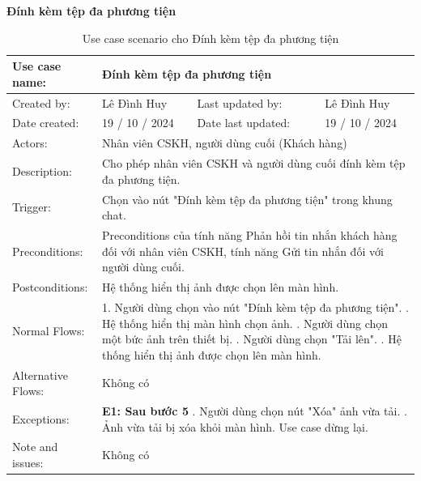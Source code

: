 \textbf{Đính kèm tệp đa phương tiện}
\begin{table}[H]
    \centering
    \begin{tabular}{|l|l|l|l|} 
        \hline
        Use case name: & \multicolumn{3}{|l|}{Đính kèm tệp đa phương tiện} \\
        \hline
        Created by: & Lê Đình Huy & Last updated by: & Lê Đình Huy \\
        \hline
        Date created: & 19 / 10 / 2024 & Date last updated: & 19 / 10 / 2024 \\
        \hline
        Actors: & \multicolumn{3}{|l|}{Nhân viên CSKH, người dùng cuối (Khách hàng)} \\
        \hline
        Description: & \multicolumn{3}{|p{12cm}|}{Cho phép nhân viên CSKH và người dùng cuối đính kèm tệp đa phương tiện.} \\ 
        \hline
        Trigger: & \multicolumn{3}{|p{12cm}|}{Chọn vào nút "Đính kèm tệp đa phương tiện" trong khung chat.} \\
        \hline
        Preconditions: & \multicolumn{3}{|p{12cm}|}{Preconditions của tính năng Phản hồi tin nhắn khách hàng đối với nhân viên CSKH, tính năng Gửi tin nhắn đối với người dùng cuối.} \\
        \hline
        Postconditions: & \multicolumn{3}{|p{12cm}|}{Hệ thống hiển thị ảnh được chọn lên màn hình.} \\
        \hline
        Normal Flows: & \multicolumn{3}{|p{12cm}|}{1. Người dùng chọn vào nút "Đính kèm tệp đa phương tiện". \newline
        2. Hệ thống hiển thị màn hình chọn ảnh. \newline
        3. Người dùng chọn một bức ảnh trên thiết bị. \newline
        4. Người dùng chọn "Tải lên". \newline
        5. Hệ thống hiển thị ảnh được chọn lên màn hình.} \\
        \hline
        Alternative Flows: & \multicolumn{3}{|p{12cm}|}{Không có} \\
        \hline
        Exceptions: & \multicolumn{3}{|p{12cm}|}{\textbf{E1: Sau bước 5} \newline
        6.1. Người dùng chọn nút "Xóa" ảnh vừa tải. \newline
        6.2. Ảnh vừa tải bị xóa khỏi màn hình. \newline
        Use case dừng lại.} \\
        \hline
        Note and issues: & \multicolumn{3}{|p{12cm}|}{Không có} \\
        \hline
    \end{tabular}
    \caption{Use case scenario cho Đính kèm tệp đa phương tiện}
\end{table}


